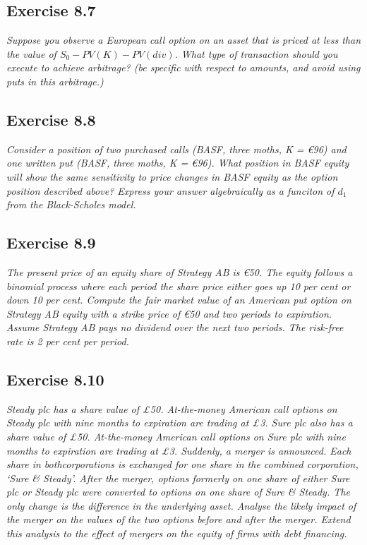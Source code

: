 \documentclass[]{book}
\newcommand{\euro}{€}
\theoremstyle{definition}
\theoremstyle{definition}
\theoremstyle{remark}
\begin{document}
\subsection{Exercise 8.7}\label{exercise-8.7}

\emph{Suppose you observe a European call option on an asset that is
priced at less than the value of
\(S_0-PV\left(K\right)-PV\left(div\right)\). What type of transaction
should you execute to achieve arbitrage? (be specific with respect to
amounts, and avoid using puts in this arbitrage.)} \citep[p.271]{book}

\subsection{Exercise 8.8}\label{exercise-8.8}

\emph{Consider a position of two purchased calls (BASF, three moths, K =
\euro{}96) and one written put (BASF, three moths, K = \euro{}96). What
position in BASF equity will show the same sensitivity to price changes
in BASF equity as the option position described above? Express your
answer algebraically as a funciton of \(d_1\) from the Black-Scholes
model.} \citep[p.271]{book}

\subsection{Exercise 8.9}\label{exercise-8.9}

\emph{The present price of an equity share of Strategy AB is \euro{}50.
The equity follows a binomial process where each period the share price
either goes up 10 per cent or down 10 per cent. Compute the fair market
value of an American put option on Strategy AB equity with a strike
price of \euro{}50 and two periods to expiration. Assume Strategy AB
pays no dividend over the next two periods. The risk-free rate is 2 per
cent per period.} \citep[p.271]{book}

\subsection{Exercise 8.10}\label{exercise-8.10}

\emph{Steady plc has a share value of £50. At-the-money American call
options on Steady plc with nine months to expiration are trading at £3.
Sure plc also has a share value of £50. At-the-money American call
options on Sure plc with nine months to expiration are trading at £3.
Suddenly, a merger is announced. Each share in bothcorporations is
exchanged for one share in the combined corporation, `Sure \& Steady'.
After the merger, options formerly on one share of either Sure plc or
Steady plc were converted to options on one share of Sure \& Steady. The
only change is the difference in the underlying asset. Analyse the
likely impact of the merger on the values of the two options before and
after the merger. Extend this analysis to the effect of mergers on the
equity of firms with debt financing.} \citep[p.271]{book}
\end{document}
